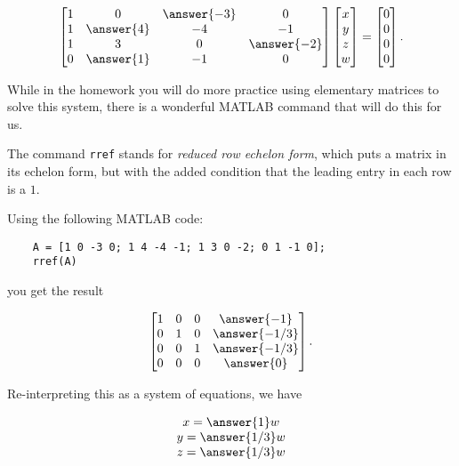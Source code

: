 \documentclass{ximera}
\begin{document}
\begin{example}
\begin{solution}
  \begin{equation*}
    \begin{bmatrix}
      1 & 0 & \answer{-3} & 0 \\
      1 & \answer{4} & -4 & -1 \\
      1 & 3 & 0 & \answer{-2} \\
      0 & \answer{1} & -1 & 0
    \end{bmatrix}
    \begin{bmatrix}
      x \\
      y \\
      z \\
      w
    \end{bmatrix}
    =
    \begin{bmatrix}
      0 \\
      0 \\
      0 \\
      0
    \end{bmatrix}.
  \end{equation*}

  While in the homework you will do more practice using elementary matrices to solve this system, there is a wonderful MATLAB command that will do this for us. 

  The command \texttt{rref} stands for \emph{reduced row echelon form}, which puts a matrix in its echelon form, but with the added condition that the leading entry in each row is a $1$.

  Using the following MATLAB code:

  \begin{verbatim}
    A = [1 0 -3 0; 1 4 -4 -1; 1 3 0 -2; 0 1 -1 0];
    rref(A)
  \end{verbatim}

  you get the result

  \begin{equation*}
    \begin{bmatrix}
      1 & 0 & 0 & \answer{-1} \\
      0 & 1 & 0 & \answer{-1/3} \\
      0 & 0 & 1 & \answer{-1/3} \\
      0 & 0 & 0 & \answer{0}
    \end{bmatrix}.
  \end{equation*}

  Re-interpreting this as a system of equations, we have

  \begin{equation*}
    \begin{array}{c}
      x = \answer{1}w \\
      y = \answer{1/3}w \\
      z = \answer{1/3}w \\
    \end{array}
  \end{equation*}


\end{solution}
\end{example}
\end{document}
